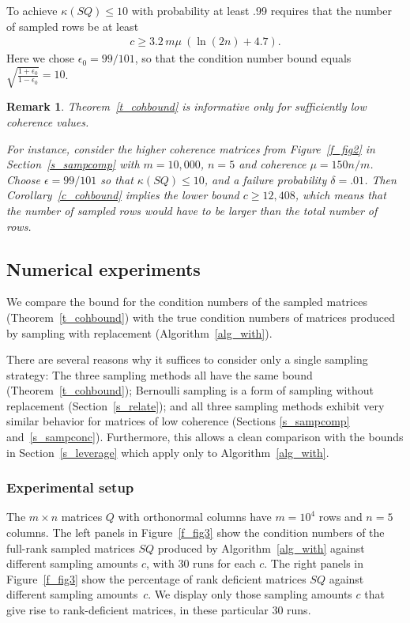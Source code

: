 \documentclass{siamltex}
\newtheorem{remark}[theorem]{Remark}
\begin{document}
To achieve $\kappa(SQ)\leq 10$ with probability at least .99
requires that the number of sampled rows be at least
\begin{eqnarray}\label{c_lb}
c\geq 3.2\,m\mu\>\left(\ln(2n)+4.7\right).
\end{eqnarray}
Here we chose $\epsilon_0=99/101$, so that the condition number bound
equals $\sqrt{\frac{1+\epsilon_0}{1-\epsilon_0}}=10$.

\begin{remark}\label{r_lowcoh}
Theorem~\ref{t_cohbound} is informative only for sufficiently low
coherence values.

For instance, consider the higher coherence
matrices from Figure~\ref{f_fig2} 
in Section~\ref{s_sampcomp} with $m=10,000$, $n=5$ and coherence
$\mu =150n/m$. Choose $\epsilon=99/101$ 
so that $\kappa(SQ)\leq 10$, 
and a failure probability $\delta = .01$. Then
Corollary~\ref{c_cohbound} implies the lower bound
$c\geq 12,408$, which means that the number of sampled rows would
have to be larger than the total number of rows.
\end{remark}

\subsection{Numerical experiments}\label{s_cohex}
We compare the bound for the condition numbers
of the sampled matrices (Theorem~\ref{t_cohbound}) with the true 
condition numbers of matrices produced by sampling with replacement 
(Algorithm~\ref{alg_with}). 

There are several reasons why
it suffices to consider only a single sampling strategy:
The three sampling methods all have
the same bound (Theorem~\ref{t_cohbound}); Bernoulli sampling
is a form of sampling without replacement (Section~\ref{s_relate});
and all three sampling methods exhibit very similar behavior
for matrices of low coherence
(Sections \ref{s_sampcomp} and~\ref{s_sampconc}).
Furthermore, this allows a clean comparison with the bounds
in Section~\ref{s_leverage} which apply only to Algorithm~\ref{alg_with}.

\subsubsection*{Experimental setup}
The $m\times n$ matrices $Q$ with orthonormal columns have $m=10^4$
rows and $n=5$ columns. 
The left panels in Figure~\ref{f_fig3} show the
condition numbers of the full-rank sampled matrices $SQ$ produced by 
Algorithm~\ref{alg_with}
against different sampling amounts $c$, with 30 runs for each $c$.
The right panels in Figure~\ref{f_fig3} show the percentage of rank
deficient matrices $SQ$ against different sampling amounts~$c$.  We
display only those sampling amounts $c$ that give rise to
rank-deficient matrices, in these particular 30 runs.
\end{document}
